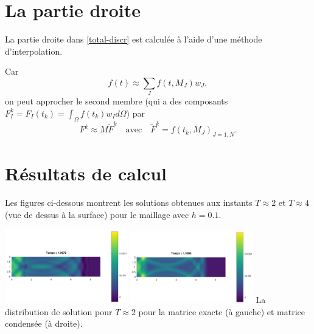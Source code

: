 \documentclass[12pt]{article}
\begin{document}
	\section{La partie droite}
	La partie droite dans \eqref{total-discr} est calculée à l'aide d'une méthode d'interpolation.
	
	Car
	\begin{equation*}
	f(t) \approx \sum_{J} f(t,M_J)w_J,
	\end{equation*}
	on peut approcher le second membre (qui a des composants $F^k_I = F_I(t_k) = \int_\Omega f(t_k) w_I d\Omega$) par
	\begin{equation*}
	F^k \approx M\tilde{F}^k \quad \text{avec} \quad \tilde{F}^k = f(t_k,M_J)_{J=1,N}.
	\end{equation*}
\section{Résultats de calcul}
Les figures ci-dessous montrent les solutions obtenues aux instants $T \approx 2$ et $T \approx 4$ (vue de dessus à la surface) pour le maillage avec $h=0.1$.
\begin{center}
	\hspace{1cm}\includegraphics[width=0.4\textwidth]{images/T2.png}\hspace{1cm}
	\includegraphics[width=0.4\textwidth]{images/T2condense.png}\hspace{1cm}
	{La distribution de solution pour $T \approx 2$ pour la matrice exacte (à gauche) et matrice condensée (à droite)}.
\end{center}
\end{document}
